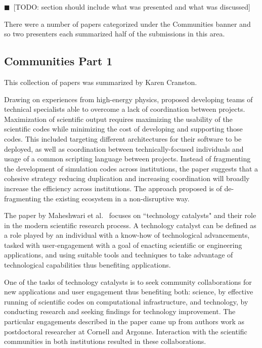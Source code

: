 \documentclass[11pt, oneside]{amsart}
\newcommand{\todo}[1]{{\color{blue}$\blacksquare$~\textsf{[TODO: #1]}}}
\begin{document}
\todo{section should include what was presented and what was discussed}

There were a number of papers categorized under the Communities banner and so
two presenters each summarized half of the submissions in this area.

\subsection{Communities Part 1}

This collection of papers was summarized by Karen Cranston.

Drawing on experiences from high-energy physics, \cite{Vay_WSSSPE} proposed
developing teams of technical specialists able to overcome a lack of
coordination between projects.  Maximization of scientific output requires
maximizing the usability of the scientific codes while minimizing the cost of
developing and supporting those codes.  This included targeting different
architectures for their software to be deployed, as well as coordination
between technically-focused individuals and usage of a common scripting
language between projects.  Instead of fragmenting the development of
simulation codes across institutions, the paper suggests that a cohesive
strategy reducing duplication and increasing coordination will broadly increase
the efficiency across institutions.  The approach proposed is of de-fragmenting
the existing ecosystem in a non-disruptive way.

The paper by Maheshwari et al.~\cite{Maheshwari_WSSSPE} focuses on ``technology
catalysts" and their role in the modern scientific research process. A technology
catalyst can be defined as a role played by an individual with a know-how of
technological advancements, tasked with user-engagement with a goal of enacting
scientific or engineering applications, and using suitable tools and techniques
to take advantage of technological capabilities thus benefiting applications.

One of the tasks of technology catalysts is to seek community collaborations for new
applications and user engagement thus benefiting both: science, by effective
running of scientific codes on computational infrastructure, and technology,
by conducting research and seeking findings for technology improvement.
The particular engagements described in the paper came up from authors work as
postdoctoral researcher at Cornell and Argonne. Interaction with the scientific
communities in both institutions resulted in these collaborations.
\end{document}
